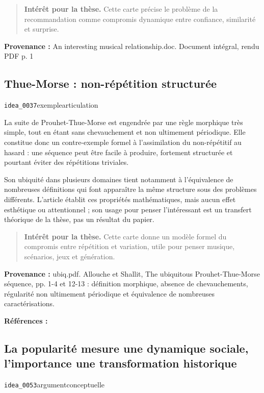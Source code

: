\documentclass[10pt,a4paper]{article}
\begin{document}
\begin{quote}
\textbf{Intérêt pour la thèse.} Cette carte précise le problème de la recommandation comme compromis dynamique entre confiance, similarité et surprise.
\end{quote}
{\footnotesize\color{metadata}\textbf{Provenance :} An interesting musical relationship.doc. Document intégral, rendu PDF p. 1\par}

\subsection{Thue-Morse : non-répétition structurée}
{\small\color{metadata} \texttt{idea\_0037}\quad\textbullet\quad exemple\quad\textbullet\quad articulation\par}

La suite de Prouhet-Thue-Morse est engendrée par une règle morphique très simple, tout en étant sans chevauchement et non ultimement périodique. Elle constitue donc un contre-exemple formel à l'assimilation du non-répétitif au hasard : une séquence peut être facile à produire, fortement structurée et pourtant éviter des répétitions triviales.

Son ubiquité dans plusieurs domaines tient notamment à l'équivalence de nombreuses définitions qui font apparaître la même structure sous des problèmes différents. L'article établit ces propriétés mathématiques, mais aucun effet esthétique ou attentionnel ; son usage pour penser l'intéressant est un transfert théorique de la thèse, pas un résultat du papier.

\begin{quote}
\textbf{Intérêt pour la thèse.} Cette carte donne un modèle formel du compromis entre répétition et variation, utile pour penser musique, scénarios, jeux et génération.
\end{quote}
{\footnotesize\color{metadata}\textbf{Provenance :} ubiq.pdf. Allouche et Shallit, The ubiquitous Prouhet-Thue-Morse séquence, pp. 1-4 et 12-13 : définition morphique, absence de chevauchements, régularité non ultimement périodique et équivalence de nombreuses caractérisations.\par}
{\footnotesize\color{metadata}\textbf{Références :} \parencite{allouche1999thueMorse}\par}

\subsection{La popularité mesure une dynamique sociale, l'importance une transformation historique}
{\small\color{metadata} \texttt{idea\_0053}\quad\textbullet\quad argument\quad\textbullet\quad conceptuelle\par}
\end{document}
